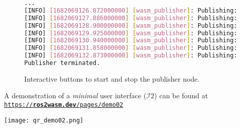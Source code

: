         \vspace{1em}
        \begin{figure}[htbp]
            \centering
            \vspace{1em}
            \begin{lstlisting}[language=Bash]
...
[INFO] [1682069126.872000000] [wasm_publisher]: Publishing: 'Hello there! 32'
[INFO] [1682069127.886000000] [wasm_publisher]: Publishing: 'Hello there! 33'
[INFO] [1682069128.900000000] [wasm_publisher]: Publishing: 'Hello there! 34'
[INFO] [1682069129.925000000] [wasm_publisher]: Publishing: 'Hello there! 35'
[INFO] [1682069130.940000000] [wasm_publisher]: Publishing: 'Hello there! 36'
[INFO] [1682069131.858000000] [wasm_publisher]: Publishing: 'Hello there! 37'
[INFO] [1682069132.873000000] [wasm_publisher]: Publishing: 'Hello there! 38'
Publisher terminated.
\end{lstlisting}
            \caption{Interactive buttons to start and stop the publisher node.}\label{fig:ui2}
        \end{figure}

        \vspace{1em}
        \begin{tcolorbox}[title=Example 5]
            \begin{minipage}[t]{0.87\linewidth}
                \vspace*{0.5\baselineskip}
                A demonstration of a \textit{minimal} user interface ($\mathcal{I}2$) can be found at \\ \href{https://ros2wasm.dev/pages/demo02/index.html}{\texttt{https://\textbf{ros2wasm.dev}/pages/demo02}}
            \end{minipage}\hfill%
            \begin{minipage}[t]{0.1\linewidth}
                \vspace*{0pt}
                \texttt{[image: qr\_demo02.png]}
            \end{minipage}
        \end{tcolorbox}


